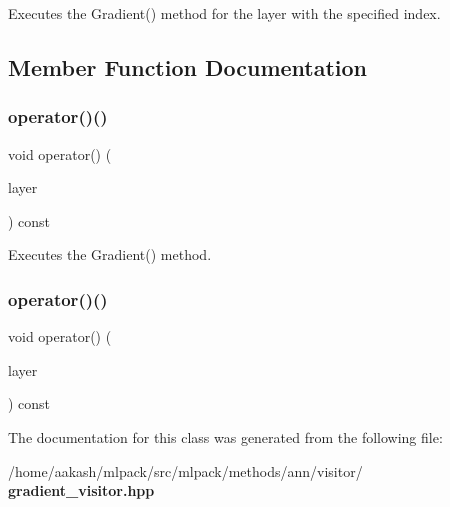 Executes the Gradient() method for the layer with the specified index. 



\subsection{Member Function Documentation}
\mbox{\label{classmlpack_1_1ann_1_1GradientVisitor_a26bb3385c630118c35f4799f1509abbc}} 
\subsubsection{operator()()\hspace{0.1cm}{\footnotesize\ttfamily [1/2]}}
{\footnotesize\ttfamily void operator() (\begin{DoxyParamCaption}\item[{Layer\+Type $\ast$}]{layer }\end{DoxyParamCaption}) const}



Executes the Gradient() method. 

\mbox{\label{classmlpack_1_1ann_1_1GradientVisitor_ae35578e7ff874a320fe762bc0edfff04}} 
\subsubsection{operator()()\hspace{0.1cm}{\footnotesize\ttfamily [2/2]}}
{\footnotesize\ttfamily void operator() (\begin{DoxyParamCaption}\item[{\textbf{ More\+Types}}]{layer }\end{DoxyParamCaption}) const}



The documentation for this class was generated from the following file\+:\begin{DoxyCompactItemize}
\item 
/home/aakash/mlpack/src/mlpack/methods/ann/visitor/\textbf{ gradient\+\_\+visitor.\+hpp}\end{DoxyCompactItemize}
